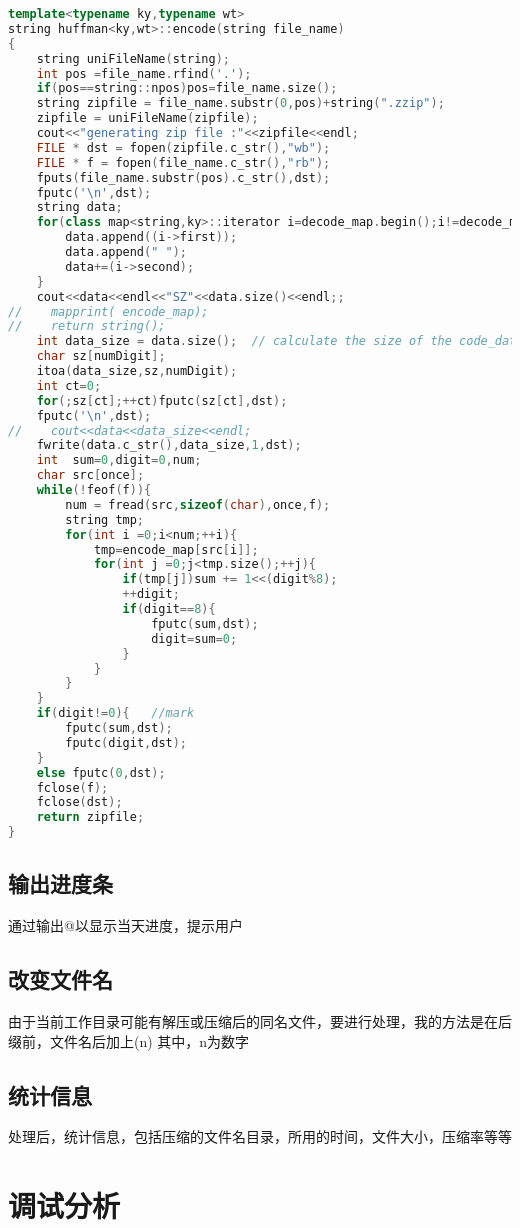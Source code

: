 \documentclass[UTF8]{ctexart}
\begin{document}
\begin{lstlisting}[language=c++]
template<typename ky,typename wt>
string huffman<ky,wt>::encode(string file_name)
{
    string uniFileName(string);
    int pos =file_name.rfind('.');
    if(pos==string::npos)pos=file_name.size();
    string zipfile = file_name.substr(0,pos)+string(".zzip");
    zipfile = uniFileName(zipfile);
    cout<<"generating zip file :"<<zipfile<<endl;
    FILE * dst = fopen(zipfile.c_str(),"wb");
    FILE * f = fopen(file_name.c_str(),"rb");
    fputs(file_name.substr(pos).c_str(),dst);
    fputc('\n',dst);
    string data;
    for(class map<string,ky>::iterator i=decode_map.begin();i!=decode_map.end() ;++i ){
        data.append((i->first));
        data.append(" ");
        data+=(i->second);
    }
    cout<<data<<endl<<"SZ"<<data.size()<<endl;;
//    mapprint( encode_map);
//    return string();
    int data_size = data.size();  // calculate the size of the code_data
    char sz[numDigit];
    itoa(data_size,sz,numDigit);
    int ct=0;
    for(;sz[ct];++ct)fputc(sz[ct],dst);
    fputc('\n',dst);
//    cout<<data<<data_size<<endl;
    fwrite(data.c_str(),data_size,1,dst);
    int  sum=0,digit=0,num;
    char src[once];
    while(!feof(f)){
        num = fread(src,sizeof(char),once,f);
        string tmp;
        for(int i =0;i<num;++i){
            tmp=encode_map[src[i]];
            for(int j =0;j<tmp.size();++j){
                if(tmp[j])sum += 1<<(digit%8);
                ++digit;
                if(digit==8){
                    fputc(sum,dst);
                    digit=sum=0;
                }
            }
        }
    }
    if(digit!=0){   //mark
        fputc(sum,dst);
        fputc(digit,dst);
    }
    else fputc(0,dst);
    fclose(f);
    fclose(dst);
    return zipfile;
}
\end{lstlisting}
\subsection{输出进度条}通过输出@以显示当天进度，提示用户
\subsection{改变文件名}由于当前工作目录可能有解压或压缩后的同名文件，要进行处理，我的方法是在后缀前，文件名后加上(n) 其中，n为数字
\subsection{统计信息}处理后，统计信息，包括压缩的文件名目录，所用的时间，文件大小，压缩率等等

\section{调试分析}
\end{document}
